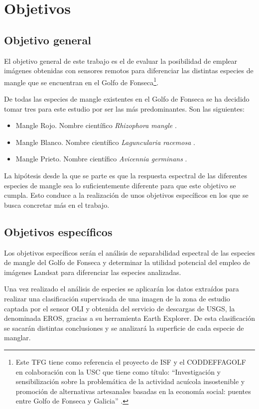 \section{Objetivos}
\subsection{Objetivo general}
El objetivo general de este trabajo es el de evaluar la posibilidad de emplear imágenes obtenidas con sensores remotos para diferenciar las distintas especies de mangle que se encuentran en el Golfo de Fonseca\footnote{Este \ac{TFG} tiene como referencia el proyecto de \ac{ISF} y el \ac{CODDEFFAGOLF} en colaboración con la \ac{USC} que tiene como título: ``Investigación y sensibilización sobre la problemática de la actividad acuícola insostenible y promoción de alternativas artesanales basadas en la economía social: puentes entre Golfo de Fonseca y Galicia'' \citep{laborate2014}.}.%

De todas las especies de mangle existentes en el Golfo de Fonseca se ha decidido tomar tres para este estudio por ser las más predominantes. Son las siguientes:

\begin{itemize}
	\item Mangle Rojo. Nombre científico \textit{Rhizophora mangle} \citep{JimenezRhizophora}.
	\item Mangle Blanco. Nombre científico \textit{Laguncularia racemosa} \citep{JimenezLaguncularia}.
	\item Mangle Prieto. Nombre científico \textit{Avicennia germinans} \citep{JimenezAvicennia}.
\end{itemize}

La hipótesis desde la que se parte es que la respuesta espectral de las diferentes especies de mangle sea lo suficientemente diferente para que este objetivo se cumpla. Esto conduce a la realización de unos objetivos específicos en los que se busca concretar más en el trabajo.

\subsection{Objetivos específicos}
Los objetivos específicos serán el análisis de separabilidad espectral de las especies de mangle del Golfo de Fonseca y determinar la utilidad potencial del empleo de imágenes Landsat para diferenciar las especies analizadas.%

Una vez realizado el análisis de especies se aplicarán los datos extraídos para realizar una clasificación supervisada de una imagen de la zona de estudio captada por el sensor \ac{OLI} y obtenida del servicio de descargas de \ac{USGS}, la denominada \ac{EROS}, gracias a su herramienta Earth Explorer. De esta clasificación se sacarán distintas conclusiones y se analizará la superficie de cada especie de manglar.%

